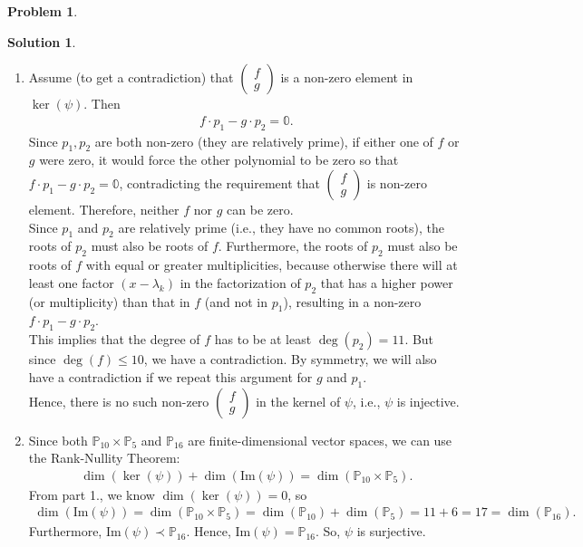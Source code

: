 \documentclass{book}
\theoremstyle{definition}
\newtheorem*{prob*}{Problem}
\newtheorem*{sln*}{Solution}
\newcommand{\ima}{\text{Im}}
\begin{document}
\begin{prob*}
\begin{sln*}
\begin{enumerate}
\begin{enumerate}
		
		
	\end{enumerate}

	
	\item Assume (to get a contradiction) that $\begin{pmatrix}
	f\\g
	\end{pmatrix}$ is a non-zero element in $\ker(\psi)$. Then 
	\begin{align*}
	f\cdot p_1 - g\cdot p_2 = \mathbb{0}.
	\end{align*}
	Since $p_1, p_2$ are both non-zero (they are relatively prime), if either one of $f$ or $g$ were zero, it would force the other polynomial to be zero so that $f\cdot p_1 - g\cdot p_2 = \mathbb{0}$, contradicting the requirement that $\begin{pmatrix}
	f\\g
	\end{pmatrix}$ is non-zero element. Therefore, neither $f$ nor $g$ can be zero. \\
	
	Since $p_1$ and $p_2$ are relatively prime (i.e., they have no common roots), the roots of $p_2$ must also be roots of $f$. Furthermore, the roots of $p_2$ must also be roots of $f$ with equal or greater multiplicities, because otherwise there will at least one factor $(x - \lambda_k)$ in the factorization of $p_2$ that has a higher power (or multiplicity) than that in $f$ (and not in $p_1$), resulting in a non-zero $f\cdot p_1 - g\cdot p_2$.\\
		
	This implies that the degree of $f$ has to be at least $\deg(p_2) = 11$. But since $\deg(f) \leq 10$, we have a contradiction. By symmetry, we will also have a contradiction if we repeat this argument for $g$ and $p_1$.\\
	
	Hence, there is no such non-zero $\begin{pmatrix}
	f\\g
	\end{pmatrix}$ in the kernel of $\psi$, i.e., $\psi$ is injective. \\
	
	
	\item Since both $\mathbb{P}_{10}\times \mathbb{P}_5$ and $\mathbb{P}_{16}$ are finite-dimensional vector spaces, we can use the Rank-Nullity Theorem:
	\begin{align*}
	\dim(\ker(\psi)) + \dim(\ima(\psi)) = \dim(\mathbb{P}_{10} \times \mathbb{P}_{5}).
	\end{align*}
	From part 1., we know $\dim(\ker(\psi)) = 0$, so
	\begin{align*}
	\dim(\ima(\psi)) = \dim(\mathbb{P}_{10} \times \mathbb{P}_{5}) = \dim(\mathbb{P}_{10}) + \dim(\mathbb{P}_5) = 11 + 6 = 17 = \dim(\mathbb{P}_{16}).
	\end{align*}
	Furthermore, $\ima(\psi) \prec \mathbb{P}_{16}$. Hence, $\ima(\psi) = \mathbb{P}_{16}$. So, $\psi$ is surjective. 




\end{enumerate}
\end{sln*}
\end{prob*}
\end{document}
